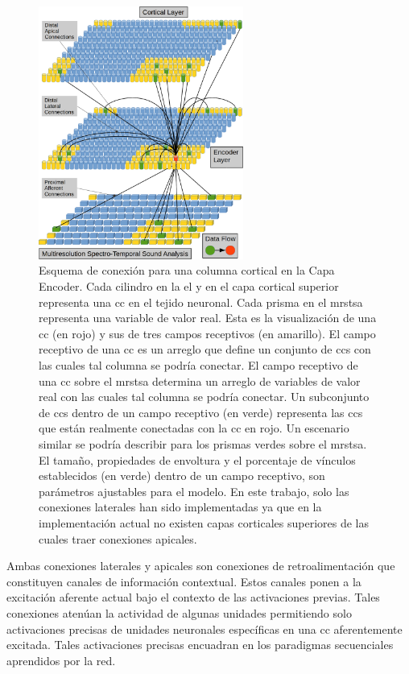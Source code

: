 {\begin{figure}[h!]
    \centering
    \includegraphics[width=0.6\textwidth]{EncoderColumnConnections.png}
    \caption{Esquema de conexión para una columna cortical en la Capa Encoder.
	    Cada cilindro en la \gls{el} y en el capa cortical superior representa una \gls{cc} en el tejido neuronal.
	    Cada prisma en el \gls{mrstsa} representa una variable de valor real.
	    Esta es la visualización de una \gls{cc} (en rojo) y sus de tres campos receptivos (en amarillo).
	    El campo receptivo de una \gls{cc} es un arreglo que define un conjunto de \glspl{cc}
	    con las cuales tal columna se podría conectar.
	    El campo receptivo de una \gls{cc} sobre el \gls{mrstsa} determina un arreglo de variables de valor real
	    con las cuales tal columna se podría conectar.
	    Un subconjunto de \glspl{cc} dentro de un campo receptivo (en verde) representa las \glspl{cc} que están realmente conectadas
	    con la \gls{cc} en rojo. Un escenario similar se podría describir para los prismas verdes sobre el \gls{mrstsa}.
	    El tamaño, propiedades de envoltura y el porcentaje de vínculos establecidos (en verde) dentro de un campo receptivo, son parámetros ajustables para el modelo.
	    En este trabajo, solo las conexiones laterales han sido implementadas ya que en la implementación actual no existen capas corticales superiores de las cuales traer conexiones apicales.}
    \label{fig:EncoderColumnConnections}
\end{figure}

Ambas conexiones laterales y apicales son conexiones de retroalimentación que constituyen canales de información contextual.
Estos canales ponen a la excitación aferente actual bajo el contexto de las activaciones previas.
Tales conexiones atenúan la actividad de algunas unidades permitiendo solo activaciones precisas
de unidades neuronales específicas en una \gls{cc} aferentemente excitada.
Tales activaciones precisas encuadran en los paradigmas secuenciales aprendidos por la red.

}

